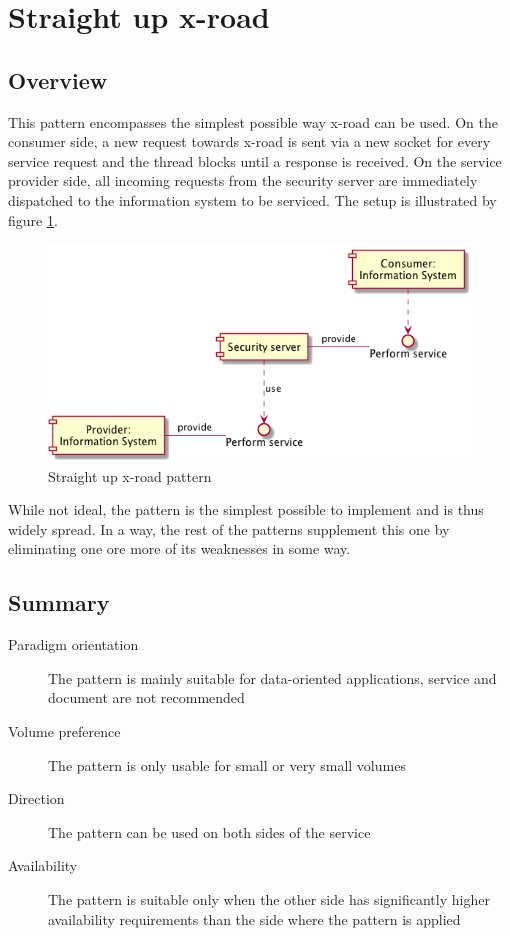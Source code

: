 \documentclass[10pt,a4paper]{article}
\begin{document}
\section{Straight up x-road}
\label{sec:p:1}
\subsection{Overview}
This pattern encompasses the simplest possible way x-road can be used. On the consumer side, a new request towards x-road is sent via a new socket for every service request and the thread blocks until a response is received. On the service provider side, all incoming requests from the security server are immediately dispatched to the information system to be serviced. The setup is illustrated by figure \ref{fig:p:1}. 

\begin{figure}[htp]
	\begin{center}
		\includegraphics[width=1\textwidth]{gfx/1_comp.png}
		\caption{Straight up x-road pattern}
		\label{fig:p:1}
	\end{center}
\end{figure}

While not ideal, the pattern is the simplest possible to implement and is thus widely spread. In a way, the rest of the patterns supplement this one by eliminating one ore more of its weaknesses in some way.

\subsection{Summary}
\begin{description}
	\item[Paradigm orientation] The pattern is mainly suitable for data-oriented applications, service and document are not recommended
	\item[Volume preference] The pattern is only usable for small or very small volumes
	\item[Direction] The pattern can be used on both sides of the service
	\item[Availability] The pattern is suitable only when the other side has significantly higher availability requirements than the side where the pattern is applied
\end{description}
\end{document}
